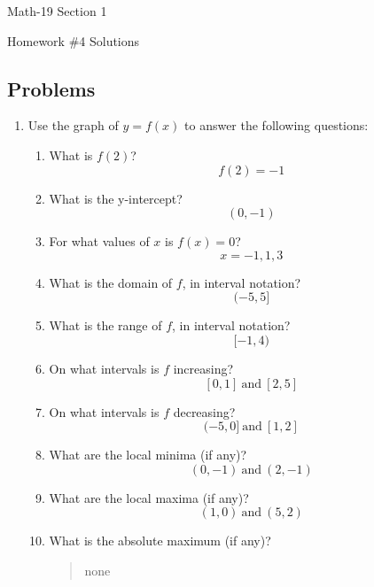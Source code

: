 \documentclass[letterpaper,12pt,fleqn]{article}
\begin{document}
\begin{center}
  \large
  Math-19 Section 1

  \Large
  Homework \#4 Solutions
\end{center}

\subsection*{Problems}

\begin{enumerate}
\item Use the graph of $y=f(x)$ to answer the following questions:


  \begin{enumerate}
  \item What is $f(2)$?
    \[f(2)=-1\]
  \item What is the y-intercept?
    \[(0,-1)\]
  \item For what values of $x$ is $f(x)=0$?
    \[x=-1,1,3\]
  \item What is the domain of $f$, in interval notation?
    \[(-5,5]\]
  \item What is the range of $f$, in interval notation?
    \[[-1,4)\]
  \item On what intervals is $f$ increasing?
    \[[0,1]\ \text{and}\ [2,5]\]
  \item On what intervals is $f$ decreasing?
    \[(-5,0]\ \text{and}\ [1,2]\]
  \item What are the local minima (if any)?
    \[(0,-1)\ \text{and}\ (2,-1)\]
  \item What are the local maxima (if any)?
    \[(1,0)\ \text{and}\ (5,2)\]
  \item What is the absolute maximum (if any)?
    \begin{quote}
      none
    \end{quote}
  \end{enumerate}


\end{enumerate}
\end{document}
